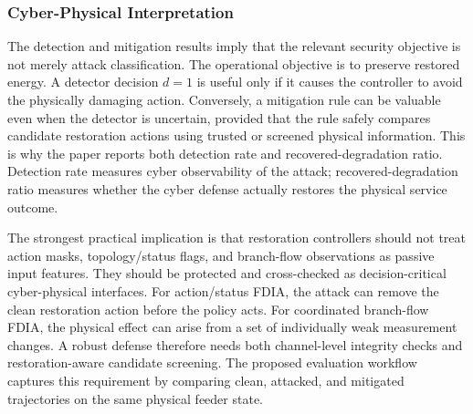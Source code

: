\subsubsection{Cyber-Physical Interpretation}
\label{subsubsec:cyber_physical_interpretation}

The detection and mitigation results imply that the relevant security objective is not merely attack classification. The operational objective is to preserve restored energy. A detector decision $d=1$ is useful only if it causes the controller to avoid the physically damaging action. Conversely, a mitigation rule can be valuable even when the detector is uncertain, provided that the rule safely compares candidate restoration actions using trusted or screened physical information. This is why the paper reports both detection rate and recovered-degradation ratio. Detection rate measures cyber observability of the attack; recovered-degradation ratio measures whether the cyber defense actually restores the physical service outcome.

The strongest practical implication is that restoration controllers should not treat action masks, topology/status flags, and branch-flow observations as passive input features. They should be protected and cross-checked as decision-critical cyber-physical interfaces. For action/status FDIA, the attack can remove the clean restoration action before the policy acts. For coordinated branch-flow FDIA, the physical effect can arise from a set of individually weak measurement changes. A robust defense therefore needs both channel-level integrity checks and restoration-aware candidate screening. The proposed evaluation workflow captures this requirement by comparing clean, attacked, and mitigated trajectories on the same physical feeder state.

